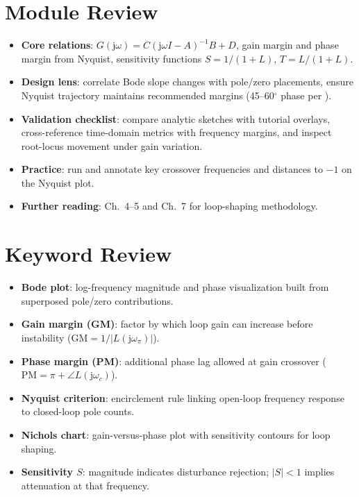 \section{Module Review}
\begin{itemize}[leftmargin=*]
    \item \textbf{Core relations}: $G(\mathrm{j}\omega) = C (\mathrm{j}\omega I - A)^{-1} B + D$, gain margin and phase margin from Nyquist, sensitivity functions $S = 1/(1+L)$, $T = L/(1+L)$.
    \item \textbf{Design lens}: correlate Bode slope changes with pole/zero placements, ensure Nyquist trajectory maintains recommended margins (45--60$^{\circ}$ phase per \textcite{astrom2006advanced}).
    \item \textbf{Validation checklist}: compare analytic sketches with tutorial overlays, cross-reference time-domain metrics with frequency margins, and inspect root-locus movement under gain variation.
    \item \textbf{Practice}: run  and annotate key crossover frequencies and distances to $-1$ on the Nyquist plot.
    \item \textbf{Further reading}: \textcite{astrom2006advanced} Ch.~4--5 and \textcite{ljung2012control} Ch.~7 for loop-shaping methodology.
\end{itemize}

\section{Keyword Review}
\begin{vocabulary}
\begin{itemize}[leftmargin=*]
    \item \textbf{Bode plot}: log-frequency magnitude and phase visualization built from superposed pole/zero contributions.
    \item \textbf{Gain margin (GM)}: factor by which loop gain can increase before instability ($\mathrm{GM} = 1/|L(\mathrm{j}\omega_\pi)|$).
    \item \textbf{Phase margin (PM)}: additional phase lag allowed at gain crossover ($\mathrm{PM} = \pi + \angle L(\mathrm{j}\omega_c)$).
    \item \textbf{Nyquist criterion}: encirclement rule linking open-loop frequency response to closed-loop pole counts.
    \item \textbf{Nichols chart}: gain-versus-phase plot with sensitivity contours for loop shaping.
    \item \textbf{Sensitivity $S$}: magnitude indicates disturbance rejection; $|S|<1$ implies attenuation at that frequency.
\end{itemize}
\end{vocabulary}
